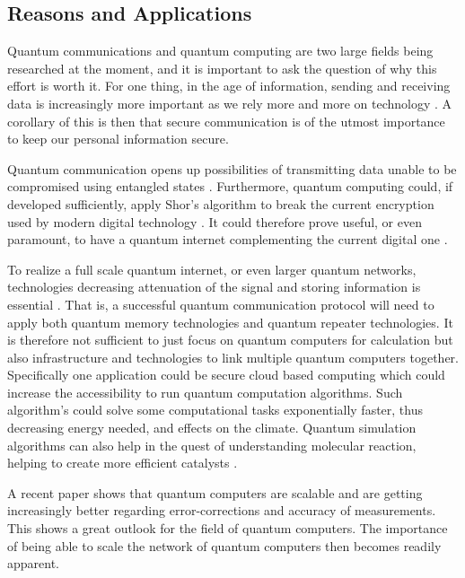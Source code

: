 \subsection{Reasons and Applications}
Quantum communications and quantum computing are two large fields being researched at the moment, and it is important to ask the question of why this effort is worth it. For one thing, in the age of information, sending and receiving data is increasingly more important as we rely more and more on technology \cite{Azuma:2023}. A corollary of this is then that secure communication is of the utmost importance to keep our personal information secure. \cite{Hu:2023}

Quantum communication opens up possibilities of transmitting data unable to be compromised using entangled states \cite{Hu:2023}. Furthermore, quantum computing could, if developed sufficiently, apply Shor's algorithm to break the current encryption used by modern digital technology \cite{Nielsen:2010}. It could therefore prove useful, or even paramount, to have a quantum internet complementing the current digital one \cite{Azuma:2023}.

To realize a full scale quantum internet, or even larger quantum networks, technologies decreasing attenuation of the signal and storing information is essential \cite{Azuma:2023}. That is, a successful quantum communication protocol will need to apply both quantum memory technologies and quantum repeater technologies. It is therefore not sufficient to just focus on quantum computers for calculation but also infrastructure and technologies to link multiple quantum computers together. Specifically one application could be secure cloud based computing \cite{Azuma:2023} which could increase the accessibility to run quantum computation algorithms. Such algorithm's could solve some computational tasks exponentially faster, thus decreasing energy needed, and effects on the climate. Quantum simulation algorithms can also help in the quest of understanding molecular reaction, helping to create more efficient catalysts \cite{Outeiral:2021}.

A recent paper \cite{Acharya:2024} shows that quantum computers are scalable and are getting increasingly better regarding error-corrections and accuracy of measurements. This shows a great outlook for the field of quantum computers. The importance of being able to scale the network of quantum computers then becomes readily apparent.